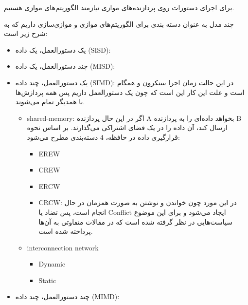 \documentclass[a4paper,10pt]{article}
\begin{document}
    برای اجرای دستورات روی پردازنده‌های موازی نیازمند الگوریتم‌های موازی هستیم.

    چند مدل به عنوان دسته بندی برای الگوریتم‌های موازی و موازی‌سازی داریم که به شرح زیر است:

    \begin{itemize}
        
        \item یک دستورالعمل، یک داده (SISD): 
        \item چند دستورالعمل، یک داده (MISD):
        \item یک دستورالعمل، چند داده (SIMD): در این حالت زمان اجرا سنکرون و همگام است و علت این کار این است که چون یک دستورالعمل داریم پس همه پردازش‌ها با همدیگر تمام می‌شوند.
        
        \begin{itemize}
            
            \item shared-memory: اگر در این حال پردازنده A بخواهد داده‌ای را به پردازنده B ارسال کند، آن داده را در یک فضای اشتراکی می‌گذارند. بر اساس نحوه قرارگیری داده در حافظه، 4 دسته‌بندی مطرح می‌شود:
            
            \begin{itemize}
                
                \item EREW
                \item CREW
                \item ERCW
                \item CRCW: در این مورد چون خواندن و نوشتن به صورت همزمان در حال انجام است، پس تضاد یا Conflict ایجاد می‌شود و برای این موضوع سیاست‌هایی در نظر گرفته شده است که در مقالات متفاوتی به آن‌ها پرداخته شده است.

            \end{itemize}

            \item interconnection network
            
            \begin{itemize}
                
                \item Dynamic
                \item Static 

            \end{itemize}

        \end{itemize}
        

        \item چند دستورالعمل، چند داده (MIMD):
        
    \end{itemize}
\end{document}
